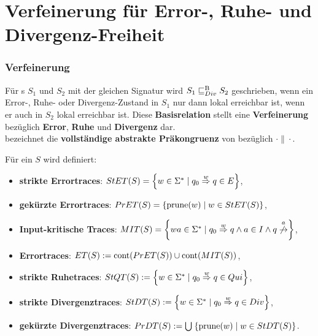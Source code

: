 \section{Verfeinerung für Error-, Ruhe- und Divergenz-Freiheit}
\begin{frame}
  \frametitle{Verfeinerung}
  \begin{Def}
    Für \EIO{}s $S_1$ und $S_2$ mit der gleichen Signatur wird $S_1\sqsubseteq _{Div}^\mathrm{B} S_2$
    geschrieben, wenn ein Error-, Ruhe- oder Divergenz-Zustand in $S_1$ nur
    dann lokal erreichbar ist, wenn er auch in $S_2$ lokal erreichbar ist. Diese
    \textbf{Basisrelation} stellt eine \textbf{Verfeinerung} bezüglich \textbf{Error},
    \textbf{Ruhe} und \textbf{Divergenz} dar.\\
    \DCRel{} bezeichnet die \textbf{vollständige abstrakte Präkongruenz} von \DBRel{}
    bezüglich $\cdot\|\cdot$.
  \end{Def}
\end{frame}

\begin{frame}
  \begin{Def}[Traces]
    Für ein \EIO{} $S$ wird definiert:
    \begin{itemize}
      \item \textbf{strikte Errortraces}: $StET{}(S)=\left\{w\in\Sigma
        ^*\mid q_0\overset{w}{\Rightarrow}q\in E\right\}$,
      \item \textbf{gekürzte Errortraces}: $PrET{}(S)=\left\{\mathrm{prune}{}(w)\mid w\in
        StET{}(S)\right\}$,
      \item \textbf{Input-kritische Traces}: $\MIT{}(S)=\left\{wa\in\Sigma ^*\mid
        q_0\overset{w}{\Rightarrow}q\wedge a\in I\wedge
      q\overset{a}{\not{\hspace{-0.1cm}\rightarrow}}\right\}$,
      \item \textbf{Errortraces}: $ET{}(S):=\mathrm{cont}{}(PrET{}(S))\cup
        \mathrm{cont}{}(MIT{}(S))$,
      \item \textbf{strikte Ruhetraces}: $StQT{}(S) := \left\{w\in\Sigma ^*\mid q_0
        \overset{w}{\Rightarrow} q\in Qui\right\}$,
      \item \textbf{strikte Divergenztraces}: $StDT{}(S) := \left\{w\in\Sigma
          ^*\mid
        q_0 \overset{w}{\Rightarrow} q\in Div\right\}$,
      \item \textbf{gekürzte Divergenztraces}: $PrDT{}(S) :=
        \bigcup\hspace{1pt}\left\{\mathrm{prune}{}(w)\mid w\in StDT{}(S)\right\}$.
    \end{itemize}
  \end{Def}
\end{frame}

